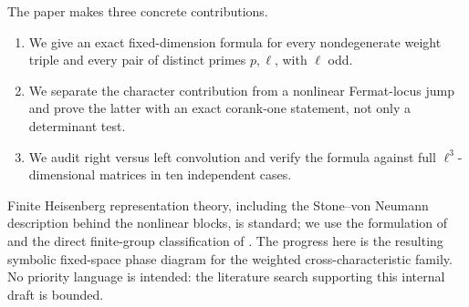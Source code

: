The paper makes three concrete contributions.
\begin{enumerate}
\item We give an exact fixed-dimension formula for every nondegenerate weight
      triple and every pair of distinct primes $p,\ell$, with $\ell$ odd.
\item We separate the character contribution from a nonlinear Fermat-locus
      jump and prove the latter with an exact corank-one statement, not only a
      determinant test.
\item We audit right versus left convolution and verify the formula against
      full $\ell^3$-dimensional matrices in ten independent cases.
\end{enumerate}

Finite Heisenberg representation theory, including the Stone--von Neumann
description behind the nonlinear blocks, is standard; we use the formulation
of \citet{GurevichHadani2010} and the direct finite-group classification of
\citet{GrassbergerHormann2001}.  The progress here is the resulting symbolic
fixed-space phase diagram for the weighted cross-characteristic family.  No
priority language is intended: the literature search supporting this internal
draft is bounded.

